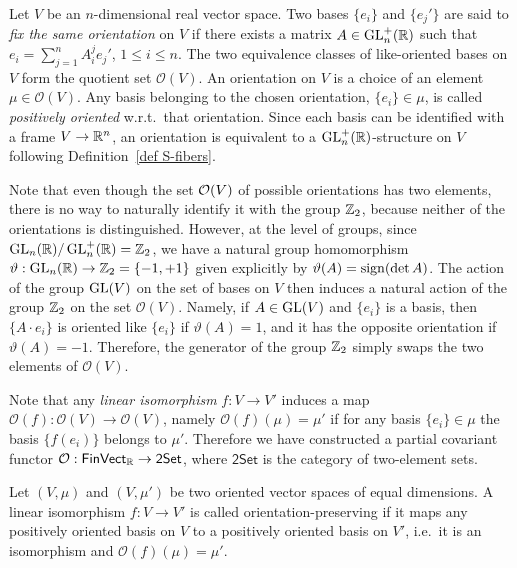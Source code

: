 \begin{defn}
Let $V$ be an $n$-dimensional real vector space. Two bases $\{e_i\}$ and $\{e_j'\}$ are said to \emph{fix the same orientation} on $V$ if there exists a matrix $A\in\operatorname{GL}^+_n(\mathbb{R} )$ such that $e_i=\sum_{j=1}^n A_i^j e_j'$, $1\leq i\leq n$. The two equivalence classes of like-oriented bases on $V$ form the quotient set $\mathcal{O}(V)$. An orientation on $V$ is a choice of an element $\mu\in\mathcal{O}(V)$. Any basis belonging to the chosen orientation, $\{e_i\}\in\mu$, is called \emph{positively oriented} w.r.t.\ that orientation. Since each basis can be identified with a frame $V\to \mathbb{R}^n$, an orientation is equivalent to a $\operatorname{GL}_n^+(\mathbb{R})$-structure on $V$ following Definition~\ref{def S-fibers}.
\end{defn}

Note that even though the set $\mathcal{O}(V)$ of possible orientations has two elements, there is no way to naturally identify it with the group $\mathbb{Z}_2$, because neither of the orientations is distinguished. However, at the level of groups, since $\operatorname{GL}_n(\mathbb{R} )\slash\operatorname{GL}^+_n(\mathbb{R} )=\mathbb{Z}_2$, we have a natural group homomorphism $\vartheta:\operatorname{GL}_n(\mathbb{R} )\to \mathbb{Z}_2=\{-1,+1\}$ given explicitly by $\vartheta(A)=\operatorname{sign} (\det A)$. The action of the group $\operatorname{GL}(V)$ on the set of bases on $V$ then induces a natural action of the group $\mathbb{Z}_2$ on the set $\mathcal{O}(V)$. Namely, if $A\in\operatorname{GL}(V)$ and $\{e_i\}$ is a basis, then $\{A\cdot e_i\}$ is oriented like $\{e_i\}$ if $\vartheta(A)=1$, and it has the opposite orientation if $\vartheta(A)=-1$. Therefore, the generator of the group $\mathbb{Z}_2$ simply swaps the two elements of $\mathcal{O}(V)$.

Note that any \emph{linear isomorphism} $f:V\to V'$ induces a map $\mathcal{O}(f):\mathcal{O}(V)\to\mathcal{O}(V)$, namely $\mathcal{O}(f)(\mu)=\mu'$ if for any basis $\{e_i\}\in\mu$ the basis $\{f(e_i)\}$ belongs to $\mu'$. Therefore we have constructed a partial covariant functor $\mathcal{O}:\mathsf{FinVect}_{\mathbb{R}} \to\mathsf{2Set}$, where $\mathsf{2Set}$ is the category of two-element sets.

\begin{defn}
Let $(V,\mu)$ and $(V,\mu')$ be two oriented vector spaces of equal dimensions. A linear isomorphism $f:V\to V'$ is called orientation-preserving if it maps any positively oriented basis on $V$ to a positively oriented basis on $V'$, i.e.\ it is an isomorphism and $\mathcal{O}(f)(\mu)=\mu'$.
\end{defn}


